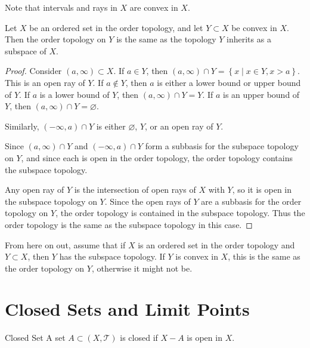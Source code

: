 \documentclass[10pt]{report}
\begin{document}
Note that intervals and rays in $X$ are convex in $X$.

\begin{thrm}{}{}
Let $X$ be an ordered set in the order topology, and let $Y \subset X$ be convex in $X$. Then the order topology on $Y$ is the same as the topology $Y$ inherits as a subspace of $X$.
\end{thrm}
\begin{proof}
	Consider $(a,\infty) \subset X$. If $a \in Y$, then $(a,\infty) \cap Y = \left\{ x \;|\; x\in Y, x > a \right\}$. This is an open ray of $Y$. If $a \not\in Y$, then $a$ is either a lower bound or upper bound of $Y$. If $a$ is a lower bound of $Y$, then $(a,\infty) \cap Y = Y$. If $a$ is an upper bound of $Y$, then $(a,\infty) \cap Y = \varnothing$.

	Similarly, $(-\infty,a) \cap Y$ is either $\varnothing$, $Y$, or an open ray of $Y$.

	Since $(a,\infty)\cap Y$ and $(-\infty,a) \cap Y$ form a subbasis for the subspace topology on $Y$, and since each is open in the order topology, the order topology contains the subspace topology.

	Any open ray of $Y$ is the intersection of open rays of $X$ with $Y$, so it is open in the subspace topology on $Y$. Since the open rays of $Y$ are a subbasis for the order topology on $Y$, the order topology is contained in the subspace topology. Thus the order topology is the same as the subspace topology in this case.
\end{proof}

From here on out, assume that if $X$ is an ordered set in the order topology and $Y \subset X$, then $Y$ has the subspace topology. If $Y$ is convex in $X$, this is the same as the order topology on $Y$, otherwise it might not be.


\section{Closed Sets and Limit Points}

\begin{defn}{Closed Set}{}
	A set $A \subset (X, \mathcal{T})$ is closed if $X-A$ is open in $X$.
\end{defn}
\end{document}
